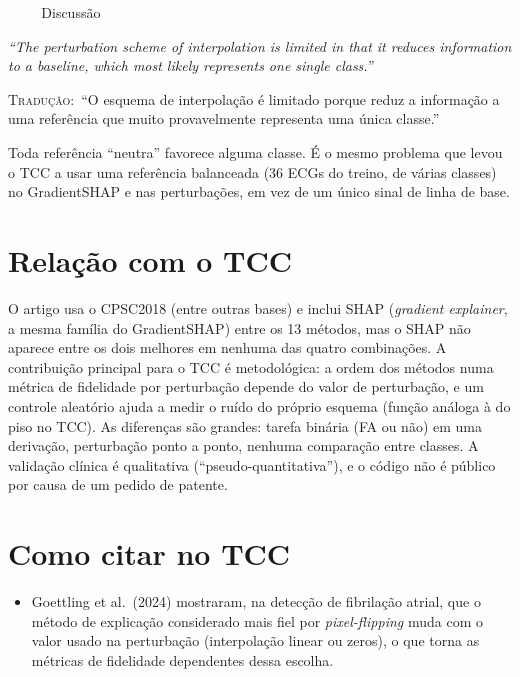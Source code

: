 \documentclass[11pt,a4paper]{article}
\newcommand{\pagechip}[1]{{\setlength{\fboxsep}{1.5pt}\colorbox{cAcc}{\textcolor{white}{\scriptsize\texttt{#1}}}}}
\newenvironment{origquote}{\par\itshape\small}{\par}
\newenvironment{tradquote}{\par\small\textsc{Tradução:}\ }{\par}
\newcommand{\explab}[1]{\par\smallskip{\small\color{cAcc}\textbf{\MakeUppercase{#1}}}\par}
\begin{document}
\begin{citacard}{\pagechip{p. 8} Discussão}
\begin{origquote}“The perturbation scheme of interpolation is limited in that it reduces information to a baseline, which most likely represents one single class.”\end{origquote}
\begin{tradquote}“O esquema de interpolação é limitado porque reduz a informação a uma referência que muito provavelmente representa uma única classe.”\end{tradquote}
\explab{Explicação}
Toda referência “neutra” favorece alguma classe. É o mesmo problema que levou o TCC a usar uma referência balanceada (36 ECGs do treino, de várias classes) no GradientSHAP e nas perturbações, em vez de um único sinal de linha de base.
\end{citacard}

\section{Relação com o TCC}
O artigo usa o CPSC2018 (entre outras bases) e inclui SHAP (\textit{gradient explainer}, a mesma família do GradientSHAP) entre os 13 métodos, mas o SHAP não aparece entre os dois melhores em nenhuma das quatro combinações. A contribuição principal para o TCC é metodológica: a ordem dos métodos numa métrica de fidelidade por perturbação depende do valor de perturbação, e um controle aleatório ajuda a medir o ruído do próprio esquema (função análoga à do piso no TCC). As diferenças são grandes: tarefa binária (FA ou não) em uma derivação, perturbação ponto a ponto, nenhuma comparação entre classes. A validação clínica é qualitativa (“pseudo-quantitativa”), e o código não é público por causa de um pedido de patente.

\section{Como citar no TCC}
\begin{itemize}
  \item Goettling et al.\ (2024) mostraram, na detecção de fibrilação atrial, que o método de explicação considerado mais fiel por \textit{pixel-flipping} muda com o valor usado na perturbação (interpolação linear ou zeros), o que torna as métricas de fidelidade dependentes dessa escolha.
\end{itemize}
\end{document}
